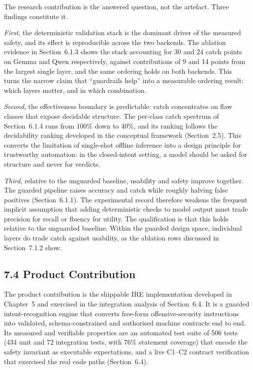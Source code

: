\documentclass[
]{article}
\begin{document}
The research contribution is the answered question, not the artefact.
Three findings constitute it.

\emph{First}, the deterministic validation stack is the dominant driver
of the measured safety, and its effect is reproducible across the two
backends. The ablation evidence in Section~6.1.3 shows the stack
accounting for 30 and 24 catch points on Gemma and Qwen respectively,
against contributions of 9 and 14 points from the largest single layer,
and the same ordering holds on both backends. This turns the narrow
claim that ``guardrails help'' into a measurable ordering result: which
layers matter, and in which combination.

\emph{Second}, the effectiveness boundary is predictable: catch
concentrates on flaw classes that expose decidable structure. The
per-class catch spectrum of Section~6.1.4 runs from 100\% down to 40\%,
and its ranking follows the decidability ranking developed in the
conceptual framework (Section~2.5). This converts the limitation of
single-shot offline inference into a design principle for trustworthy
automation: in the closed-intent setting, a model should be asked for
structure and never for verdicts.

\emph{Third}, relative to the unguarded baseline, usability and safety
improve together. The guarded pipeline raises accuracy and catch while
roughly halving false positives (Section~6.1.1). The experimental record
therefore weakens the frequent implicit assumption that adding
deterministic checks to model output must trade precision for recall or
fluency for utility. The qualification is that this holds relative to
the unguarded baseline. Within the guarded design space, individual
layers do trade catch against usability, as the ablation rows discussed
in Section~7.1.2 show.

\hypertarget{product-contribution}{%
\subsection{7.4 Product Contribution}\label{product-contribution}}

The product contribution is the shippable IRE implementation developed
in Chapter~5 and exercised in the integration analysis of Section~6.4.
It is a guarded intent-recognition engine that converts free-form
offensive-security instructions into validated, schema-constrained and
authorised machine contracts end to end. Its measured and verifiable
properties are an automated test suite of 506 tests (434 unit and 72
integration tests, with 76\% statement coverage) that encode the safety
invariant as executable expectations, and a live C1--C2 contract
verification that exercised the real code paths (Section~6.4).
\end{document}
